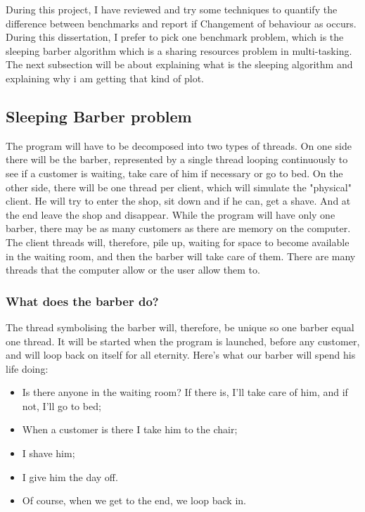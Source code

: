 \documentclass{article}
\begin{document}
During this project, I have reviewed and try some techniques to quantify the difference between benchmarks and report if Changement of behaviour as occurs. During this dissertation, I prefer to pick one benchmark problem, which is the sleeping barber algorithm \cite{reynolds2002linda} which is a sharing resources problem in multi-tasking. The next subsection will be about explaining what is the sleeping algorithm and explaining why i am getting that kind of plot.

\subsection{Sleeping Barber problem}

The program will have to be decomposed into two types of threads. On one side there will be the barber, represented by a single thread looping continuously to see if a customer is waiting, take care of him if necessary or go to bed. On the other side, there will be one thread per client, which will simulate the "physical" client. He will try to enter the shop, sit down and if he can, get a shave. And  at the end leave the shop and disappear.
While the program will have only one barber, there may be as many customers as there are memory on the computer. The client threads will, therefore, pile up, waiting for space to become available in the waiting room, and then the barber will take care of them. There are many threads that the computer allow or the user allow them to.

\subsubsection{ What does the barber do?}
The thread symbolising the barber will, therefore, be unique so one barber equal one thread. It will be started when the program is launched, before any customer, and will loop back on itself for all eternity.
Here's what our barber will spend his life doing:

\begin{itemize}
    \item Is there anyone in the waiting room? If there is, I'll take care of him, and if not, I'll go to bed;
    \item When a customer is there I take him to the chair;
    \item I shave him;
    \item I give him the day off.
    \item Of course, when we get to the end, we loop back in.
\end{itemize}
\end{document}
